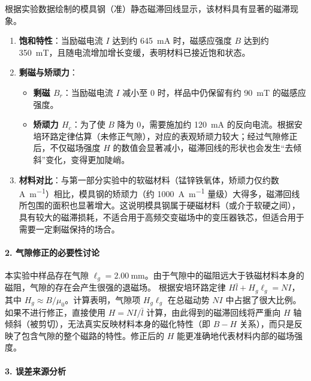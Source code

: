 \documentclass[11pt]{article}
\begin{document}
根据实验数据绘制的模具钢（准）静态磁滞回线显示，该材料具有显著的磁滞现象。
\begin{enumerate}
    \item \textbf{饱和特性}：当励磁电流 $I$ 达到约 \SI{645}{\milli\ampere} 时，磁感应强度 $B$ 达到约 \SI{350}{\milli\tesla}，且随电流增加增长变缓，表明材料已接近饱和状态。
    \item \textbf{剩磁与矫顽力}：
    \begin{itemize}
        \item \textbf{剩磁 $B_r$}：当励磁电流 $I$ 减小至 0 时，样品中仍保留有约 \SI{90}{\milli\tesla} 的磁感应强度。
        \item \textbf{矫顽力 $H_c$}：为了使 $B$ 降为 0，需要施加约 \SI{120}{\milli\ampere} 的反向电流。根据安培环路定律估算（未修正气隙），对应的表观矫顽力较大；经过气隙修正后，不仅磁场强度 $H$ 的数值会显著减小，磁滞回线的形状也会发生“去倾斜”变化，变得更加陡峭。
    \end{itemize}
    \item \textbf{材料对比}：与第一部分实验中的软磁材料（锰锌铁氧体，矫顽力仅约数 \si{\ampere\per\meter}）相比，模具钢的矫顽力（约 \SI{1000}{\ampere\per\meter} 量级）大得多，磁滞回线所包围的面积也显著增大。这说明模具钢属于硬磁材料（或介于软硬之间），具有较大的磁滞损耗，不适合用于高频交变磁场中的变压器铁芯，但适合用于需要一定剩磁保持的场合。
\end{enumerate}

\paragraph{2. 气隙修正的必要性讨论}

本实验中样品存在气隙 $\ell_g = \SI{2.00}{\milli\meter}$。由于气隙中的磁阻远大于铁磁材料本身的磁阻，气隙的存在会产生很强的退磁场。
根据安培环路定律 $H\bar{l} + H_g\ell_g = NI$，其中 $H_g \approx B/\mu_0$。计算表明，气隙项 $H_g\ell_g$ 在总磁动势 $NI$ 中占据了很大比例。如果不进行修正，直接使用 $H = NI/\bar{l}$ 计算，由此得到的磁滞回线将严重向 $H$ 轴倾斜（被剪切），无法真实反映材料本身的磁化特性（即 $B-H$ 关系），而只是反映了包含气隙的整个磁路的特性。修正后的 $H$ 能更准确地代表材料内部的磁场强度。

\paragraph{3. 误差来源分析}
\end{document}
